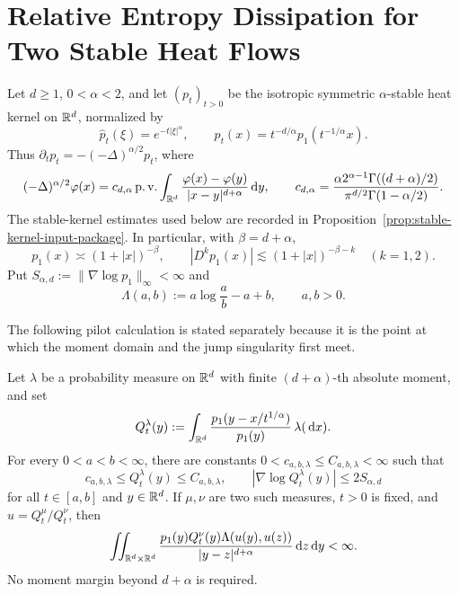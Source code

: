 \section{Relative Entropy Dissipation for Two Stable Heat Flows}
\label{sec:fractional-heat-relative-entropy}

Let \(d\ge1\), \(0<\alpha<2\), and let \((p_t)_{t>0}\) be the
isotropic symmetric \(\alpha\)-stable heat kernel on \(\mathbb{R}^d\), normalized by
\begin{equation}\label{eq:stable-heat-fourier-normalization}
 \widehat p_t(\xi)=e^{-t|\xi|^\alpha},
 \qquad p_t(x)=t^{-d/\alpha}p_1(t^{-1/\alpha}x).
\end{equation}
Thus \(\partial_t p_t=-(-\Delta)^{\alpha/2}p_t\), where
\begin{equation}\label{eq:fractional-laplacian-normalization}
 (-\Delta)^{\alpha/2}\varphi(x)
 =c_{d,\alpha}\operatorname{p.v.}\int_{\mathbb{R}^d}
 \frac{\varphi(x)-\varphi(y)}{|x-y|^{d+\alpha}}\,\mathrm{d} y,
 \qquad
 c_{d,\alpha}
 =\frac{\alpha2^{\alpha-1}
 \Gamma((d+\alpha)/2)}{\pi^{d/2}\Gamma(1-\alpha/2)}.
\end{equation}
The stable-kernel estimates used below are recorded in
Proposition~\ref{prop:stable-kernel-input-package}.  In particular, with
\(\beta=d+\alpha\),
\begin{equation}\label{eq:stable-heat-section-kernel-package}
 p_1(x)\asymp(1+|x|)^{-\beta},\qquad
 |D^kp_1(x)|\lesssim(1+|x|)^{-\beta-k}\quad(k=1,2).
\end{equation}
Put \(S_{\alpha,d}:=\|\nabla\log p_1\|_\infty<\infty\) and
\begin{equation}\label{eq:stable-log-bregman-definition}
 \Lambda(a,b):=a\log\frac ab-a+b,
 \qquad a,b>0.
\end{equation}

The following pilot calculation is stated separately because it is the
point at which the moment domain and the jump singularity first meet.

\begin{lemma}
\label{lem:stable-quotient-pilot}
Let \(\lambda\) be a probability measure on \(\mathbb{R}^d\) with finite
\((d+\alpha)\)-th absolute moment, and set
\[
 Q_t^\lambda(y):=\int_{\mathbb{R}^d}
 \frac{p_1(y-x/t^{1/\alpha})}{p_1(y)}\,\lambda(\,\mathrm{d} x).
\]
For every \(0<a<b<\infty\), there are constants
\(0<c_{a,b,\lambda}\le C_{a,b,\lambda}<\infty\) such that
\begin{equation}\label{eq:pilot-two-sided-score-bounds}
 c_{a,b,\lambda}\le Q_t^\lambda(y)\le C_{a,b,\lambda},
 \qquad
 |\nabla\log Q_t^\lambda(y)|\le2S_{\alpha,d}
\end{equation}
for all \(t\in[a,b]\) and \(y\in\mathbb{R}^d\).  If \(\mu,\nu\) are two such
measures, \(t>0\) is fixed, and \(u=Q_t^\mu/Q_t^\nu\), then
\begin{equation}\label{eq:pilot-bregman-integral-finite}
 \iint_{\mathbb{R}^d\times\mathbb{R}^d}
 \frac{p_1(y)Q_t^\nu(y)\Lambda(u(y),u(z))}
 {|y-z|^{d+\alpha}}\,\mathrm{d} z\,\mathrm{d} y<\infty.
\end{equation}
No moment margin beyond \(d+\alpha\) is required.
\end{lemma}

